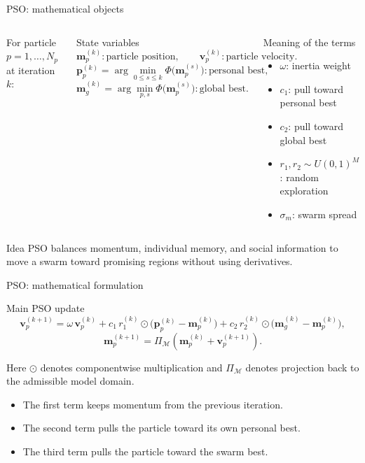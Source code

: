 \documentclass[aspectratio=169]{beamer}
\renewcommand{\vec}[1]{\mathbf{#1}}
\newcommand{\mm}{ {\vec{m}} }
\begin{document}
\begin{frame}{PSO: mathematical objects}
\small

\begin{columns}[T]
For particle $p=1,\dots,N_p$ at iteration $k$:
\begin{block}{State variables}
\[
\mm_p^{(k)}: \text{particle position},
\qquad
\vec{v}_p^{(k)}: \text{particle velocity}.
\]
\[
\vec{p}_p^{(k)} = \arg\min_{0\leq s\leq k} \Phi\big(\mm_p^{(s)}\big): \text{personal best},
\]
\[
\mm_g^{(k)} = \arg\min_{p,s} \Phi\big(\mm_p^{(s)}\big): \text{global best}.
\]
\end{block}

\begin{block}{Meaning of the terms}
\begin{itemize}
    \item[--] $\omega$: inertia weight
    \item[--] $c_1$: pull toward personal best
    \item[--] $c_2$: pull toward global best
    \item[--] $r_1,r_2\sim U(0,1)^M$: random exploration
    \item[--] $\sigma_m$: swarm spread
\end{itemize}
\end{block}
\end{columns}

\begin{alertblock}{Idea}
PSO balances momentum, individual memory, and social information to move a swarm toward promising regions without using derivatives.
\end{alertblock}
\end{frame}

\begin{frame}{PSO: mathematical formulation}
\small

\begin{alertblock}{Main PSO update}
\[
\vec{v}_p^{(k+1)}
=
\omega\,\vec{v}_p^{(k)}
+
 c_1\,r_1^{(k)}\odot\big(\vec{p}_p^{(k)}-\mm_p^{(k)}\big)
+
 c_2\,r_2^{(k)}\odot\big(\mm_g^{(k)}-\mm_p^{(k)}\big),
\]
\[
\mm_p^{(k+1)} = \Pi_{\mathcal{M}}\left(\mm_p^{(k)}+\vec{v}_p^{(k+1)}\right).
\]
\end{alertblock}

Here $\odot$ denotes componentwise multiplication and $\Pi_{\mathcal{M}}$ denotes projection back to the admissible model domain.

\begin{itemize}
    \item[--] The first term keeps momentum from the previous iteration.
    \item[--] The second term pulls the particle toward its own personal best.
    \item[--] The third term pulls the particle toward the swarm best.
\end{itemize}
\end{frame}
\end{document}
